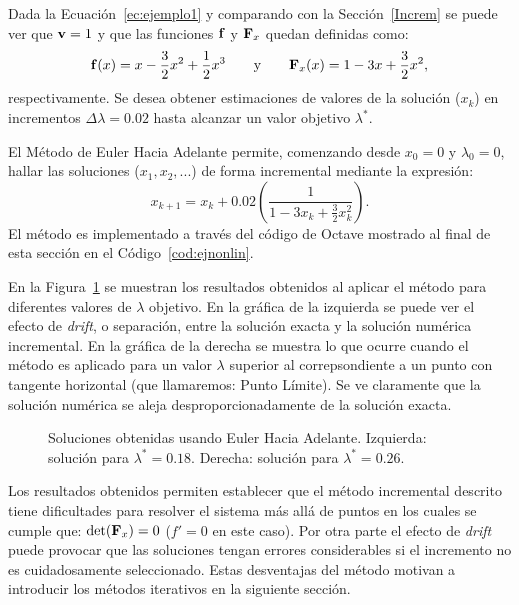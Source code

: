 Dada la Ecuación~\eqref{ec:ejemplo1} y comparando con la Sección~\ref{Increm} se puede ver que ${\bf v} = 1$ y que las funciones ${\bf f}$ y ${\bf F}_x$ quedan definidas como: 
%
\begin{equation}
	{\bf f}(x)=x-\frac{3}{2}x^2+\frac{1}{2}x^3 \qquad \text{y} \qquad  {\bf F}_x(x)=1-3x+\frac{3}{2}x^2,
\end{equation}
respectivamente. %
%
Se desea obtener estimaciones de valores de la solución ($x_k$) en incrementos $\Delta \lambda=0.02$ hasta alcanzar un valor objetivo $\lambda^*$. %

El Método de Euler Hacia Adelante permite, comenzando desde $x_0=0$ y $\lambda_0=0$, hallar las soluciones ($x_1, x_2, ...$) de forma incremental mediante la expresión:
%
\begin{equation}
	x_{k+1} = x_k + 0.02 \left(\frac{1}{1-3x_k+\frac{3}{2}x_k^2}\right).
\end{equation}
%
El método es implementado a través del código de Octave mostrado al final de esta sección en el Código~\ref{cod:ejnonlin}.

En la Figura~\ref{fig:fig1} se muestran los resultados obtenidos al aplicar el método para diferentes valores de $\lambda$ objetivo. %
En la gráfica de la izquierda se puede ver el efecto de \textit{drift}, o separación, entre la solución exacta y la solución numérica incremental. %
En la gráfica de la derecha se muestra lo que ocurre cuando el método es aplicado para un valor $\lambda$ superior al correpsondiente a un punto con tangente horizontal (que llamaremos: Punto Límite). %
%
Se ve claramente que la solución numérica se aleja desproporcionadamente de la solución exacta.

\begin{figure}[htb]
	\centering
	\resizebox{\textwidth}{!}{}
	\caption{Soluciones obtenidas usando Euler Hacia Adelante. Izquierda: solución para $\lambda^*=0.18$. Derecha: solución para $\lambda^*=0.26$.}
	\label{fig:fig1}
\end{figure}

Los resultados obtenidos permiten establecer que el método incremental descrito tiene dificultades para resolver el sistema más allá de puntos en los cuales se cumple que: $\det({\bf F}_x)=0$ ($f'=0$ en este caso). %
%
Por otra parte el efecto de \textit{drift} puede provocar que las soluciones tengan errores considerables si el incremento no es cuidadosamente seleccionado. %
%
Estas desventajas del método motivan a introducir los métodos iterativos en la siguiente sección.







